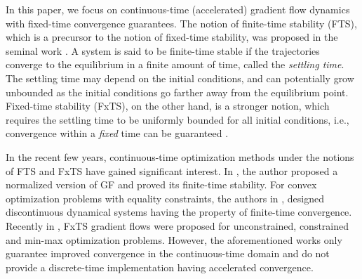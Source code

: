 \documentclass[letterpaper]{article}
\begin{document}



In this paper, we focus on continuous-time (accelerated) gradient flow dynamics with fixed-time convergence guarantees. The notion of finite-time stability (FTS), which is a precursor to the notion of fixed-time stability, was proposed in the seminal work \cite{bhat2000}. A system is said to be finite-time stable if the trajectories converge to the equilibrium in a finite amount of time, called the {\it settling time}. The settling time may depend on the initial conditions, and can potentially grow unbounded as the initial conditions go farther away from the equilibrium point. Fixed-time stability (FxTS), on the other hand, is a stronger notion, which requires the settling time to be uniformly bounded for all initial conditions, i.e., convergence within a \textit{fixed} time can be guaranteed \cite{polyakov2011nonlinear}.

In the recent few years, continuous-time optimization methods under the notions of FTS and FxTS have gained significant interest. In \cite{cortes2006}, the author proposed a normalized version of GF and proved its finite-time stability. For convex optimization problems with equality constraints, the authors in \cite{chen2018}, designed discontinuous dynamical systems having the property of finite-time convergence. Recently in \cite{kunal2021}, FxTS gradient flows were proposed for unconstrained, constrained and min-max optimization problems. However, the aforementioned works only guarantee improved convergence in the continuous-time domain and do not provide a discrete-time implementation having accelerated convergence.
\end{document}
